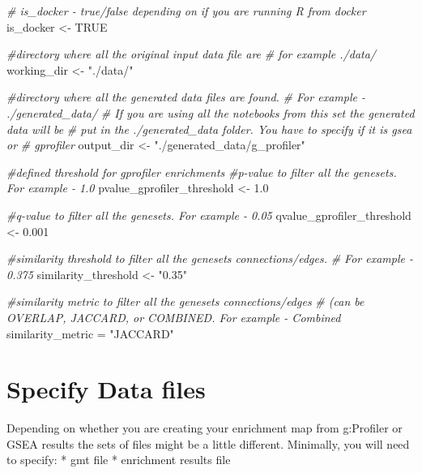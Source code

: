\documentclass[
]{book}
\newenvironment{Shaded}{\begin{snugshade}}{\end{snugshade}}
\newcommand{\CommentTok}[1]{\textcolor[rgb]{0.56,0.35,0.01}{\textit{#1}}}
\newcommand{\ConstantTok}[1]{\textcolor[rgb]{0.00,0.00,0.00}{#1}}
\newcommand{\FloatTok}[1]{\textcolor[rgb]{0.00,0.00,0.81}{#1}}
\newcommand{\NormalTok}[1]{#1}
\newcommand{\OtherTok}[1]{\textcolor[rgb]{0.56,0.35,0.01}{#1}}
\newcommand{\StringTok}[1]{\textcolor[rgb]{0.31,0.60,0.02}{#1}}
\begin{document}
\begin{Shaded}
\begin{Highlighting}[]
\CommentTok{\# is\_docker {-} true/false depending on if you are running R from docker}
\NormalTok{is\_docker }\OtherTok{\textless{}{-}} \ConstantTok{TRUE}

\CommentTok{\#directory where all the original input data file are}
\CommentTok{\# for example ./data/}
\NormalTok{working\_dir }\OtherTok{\textless{}{-}} \StringTok{"./data/"}


\CommentTok{\#directory where all the generated data files are found.}
\CommentTok{\# For example {-} ./generated\_data/}
\CommentTok{\# If you are using all the notebooks from this set the generated data will be}
\CommentTok{\# put in the ./generated\_data folder.  You have to specify if it is gsea or }
\CommentTok{\# gprofiler}
\NormalTok{output\_dir }\OtherTok{\textless{}{-}} \StringTok{"./generated\_data/g\_profiler"}


\CommentTok{\#defined threshold for gprofiler enrichments }
\CommentTok{\#p{-}value to filter all the genesets.  For example {-}   1.0}
\NormalTok{pvalue\_gprofiler\_threshold }\OtherTok{\textless{}{-}} \FloatTok{1.0}

\CommentTok{\#q{-}value to filter all the genesets.  For example {-}   0.05}
\NormalTok{qvalue\_gprofiler\_threshold }\OtherTok{\textless{}{-}} \FloatTok{0.001}

\CommentTok{\#similarity threshold to filter all the genesets connections/edges.  }
\CommentTok{\# For example {-}   0.375}
\NormalTok{similarity\_threshold }\OtherTok{\textless{}{-}} \StringTok{"0.35"}

\CommentTok{\#similarity metric to filter all the genesets connections/edges }
\CommentTok{\# (can be OVERLAP, JACCARD, or COMBINED.   For example {-}   Combined}
\NormalTok{similarity\_metric }\OtherTok{=} \StringTok{"JACCARD"}
\end{Highlighting}
\end{Shaded}

\hypertarget{specify-data-files}{%
\section{Specify Data files}\label{specify-data-files}}

Depending on whether you are creating your enrichment map from g:Profiler or GSEA results the sets of files might be a little different. Minimally, you will need to specify:
* gmt file
* enrichment results file
\end{document}
